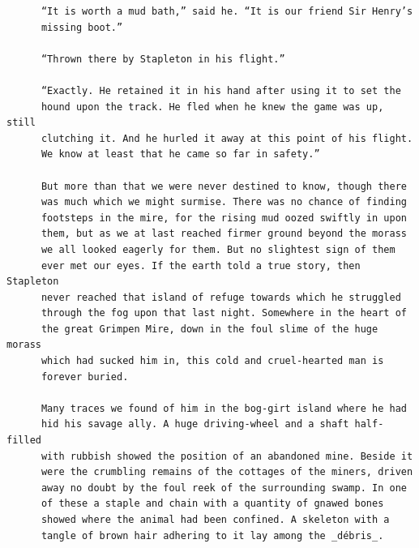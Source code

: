 \documentclass{article}
\begin{document}
\begin{verbatim}
      “It is worth a mud bath,” said he. “It is our friend Sir Henry’s
      missing boot.”

      “Thrown there by Stapleton in his flight.”

      “Exactly. He retained it in his hand after using it to set the
      hound upon the track. He fled when he knew the game was up, still
      clutching it. And he hurled it away at this point of his flight.
      We know at least that he came so far in safety.”

      But more than that we were never destined to know, though there
      was much which we might surmise. There was no chance of finding
      footsteps in the mire, for the rising mud oozed swiftly in upon
      them, but as we at last reached firmer ground beyond the morass
      we all looked eagerly for them. But no slightest sign of them
      ever met our eyes. If the earth told a true story, then Stapleton
      never reached that island of refuge towards which he struggled
      through the fog upon that last night. Somewhere in the heart of
      the great Grimpen Mire, down in the foul slime of the huge morass
      which had sucked him in, this cold and cruel-hearted man is
      forever buried.

      Many traces we found of him in the bog-girt island where he had
      hid his savage ally. A huge driving-wheel and a shaft half-filled
      with rubbish showed the position of an abandoned mine. Beside it
      were the crumbling remains of the cottages of the miners, driven
      away no doubt by the foul reek of the surrounding swamp. In one
      of these a staple and chain with a quantity of gnawed bones
      showed where the animal had been confined. A skeleton with a
      tangle of brown hair adhering to it lay among the _débris_.


\end{verbatim}
\end{document}
